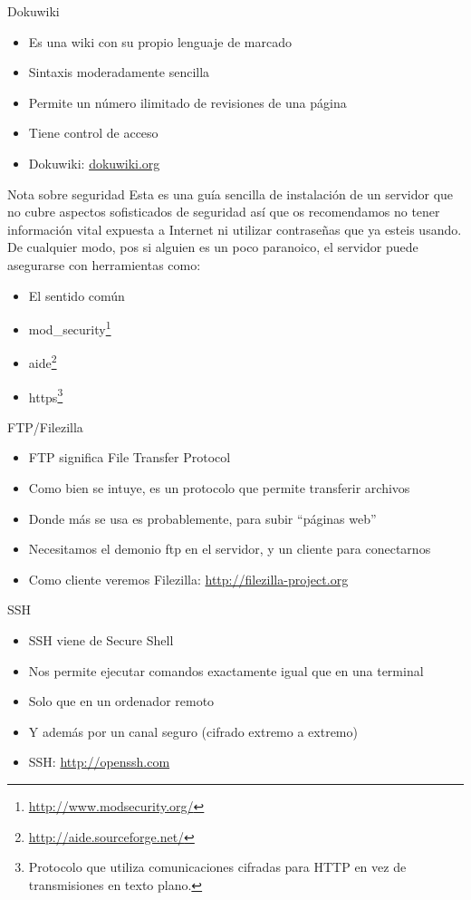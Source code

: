\documentclass[spanish]{beamer}
\begin{document}
\begin{frame}{Dokuwiki}
\begin{itemize}
\item Es una wiki con su propio lenguaje de marcado
\item Sintaxis moderadamente sencilla
\item Permite un número ilimitado de revisiones de una página
\item Tiene control de acceso
\item Dokuwiki: \url{dokuwiki.org}
\end{itemize}
\end{frame}

\begin{frame}{Nota sobre seguridad}
Esta es una guía sencilla de instalación de un servidor que no cubre aspectos sofisticados de seguridad así que os recomendamos no tener información vital expuesta a Internet ni utilizar contraseñas que ya esteis usando. De cualquier modo, pos si alguien es un poco paranoico, el servidor puede asegurarse con herramientas como:
\begin{itemize}
\item El sentido común
\item mod\_security\footnote{\url{http://www.modsecurity.org/}}
\item aide\footnote{\url{http://aide.sourceforge.net/}}
\item https\footnote{Protocolo que utiliza comunicaciones cifradas para HTTP en vez de transmisiones en texto plano.}
\end{itemize}
\end{frame}

\begin{frame}{FTP/Filezilla}
\begin{itemize}
\item FTP significa File Transfer Protocol
\item Como bien se intuye, es un protocolo que permite transferir archivos
\item Donde más se usa es probablemente, para subir ``páginas web''
\item Necesitamos el demonio ftp en el servidor, y un cliente para conectarnos
\item Como cliente veremos Filezilla: \url{http://filezilla-project.org}
\end{itemize}
\end{frame}

\begin{frame}{SSH}
\begin{itemize}
\item SSH viene de Secure Shell
\item Nos permite ejecutar comandos exactamente igual que en una terminal
\item Solo que en un ordenador remoto
\item Y además por un canal seguro (cifrado extremo a extremo)
\item SSH: \url{http://openssh.com}
\end{itemize}
\end{frame}
\end{document}
